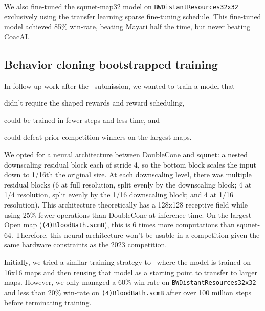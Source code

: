 \documentclass{article}
\begin{document}
We also fine-tuned the squnet-map32 model on \texttt{BWDistantResources32x32}
exclusively using the transfer learning sparse fine-tuning schedule. This fine-tuned 
model achieved 85\% win-rate, beating Mayari half the time, but never beating CoacAI.

\subsection{Behavior cloning bootstrapped training}
In follow-up work after the \agentName\ submission, we wanted to train a model that
\begin{inparaenum}[(1)]
    \item didn't require the shaped rewards and reward scheduling,
    \item could be trained in fewer steps and less time, and
    \item could defeat prior competition winners on the largest maps.
\end{inparaenum}
We opted for a neural architecture between DoubleCone and squnet: a nested downscaling residual
block each of stride 4, so the bottom block scales the input down to 1/16th the original
size. At each downscaling level, there was multiple residual blocks (6 at full
resolution, split evenly by the downscaling block; 4 at 1/4 resolution, split evenly by
the 1/16 downscaling block; and 4 at 1/16 resolution). This architecture theoretically
has a 128x128 receptive field while using 25\% fewer operations than DoubleCone at inference time. On
the largest Open map (\texttt{(4)BloodBath.scmB}), this is 6 times more
computations than squnet-64. Therefore, this neural architecture won't be usable in a
competition given the same hardware constraints as the 2023 competition.

Initially, we tried a similar training strategy to \agentName\ where the model is
trained on 16x16 maps and then reusing that model as a starting point to transfer to
larger maps. However, we only managed a 60\% win-rate on
\texttt{BWDistantResources32x32} and less than 20\% win-rate on
\texttt{(4)BloodBath.scmB} after over 100 million
steps before terminating training.
\end{document}

